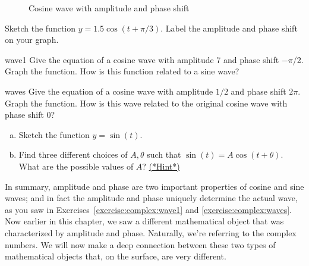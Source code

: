 \begin{figure}[htb]
	  \caption{\label{fig:complex:2} Cosine wave with amplitude and phase shift}
\end{figure}

\begin{exercise}{41}
Sketch the function $y = 1.5 \cos(t + \pi/3)$. Label the amplitude and phase shift on your graph.
\end{exercise}

\begin{exercise}{wave1}
Give the equation of a cosine wave with amplitude 7 and phase shift $-\pi$/2. Graph the function. How is this function related to a sine wave?
\end{exercise}

\begin{exercise}{waves}
Give the equation of a cosine wave with amplitude $1/2$ and phase shift $2\pi$. Graph the function. How is this wave related to the original cosine wave with phase shift 0?
\end{exercise}

\begin{exercise}{42}
\begin{enumerate}[(a)]
\item
Sketch the function $y = \sin(t)$.
\item
Find three different  choices of $A,\theta$ such that 
$ \sin(t) = A  \cos (t + \theta)$.  What are the possible values of $A$?
\hyperref[sec:complex:hints]{(*Hint*)}

\end{enumerate}
\end{exercise}

\noindent
In summary, amplitude and phase are two important properties of cosine and sine waves; and in fact the amplitude and phase uniquely determine the actual wave, as you saw in Exercises~\ref{exercise:complex:wave1} and \ref{exercise:complex:waves}. Now earlier in this chapter, we saw a different mathematical object that was characterized by amplitude and phase. Naturally, we're referring to the complex numbers.  We will now make a deep connection between these two types of mathematical objects that, on the surface, are very different.

